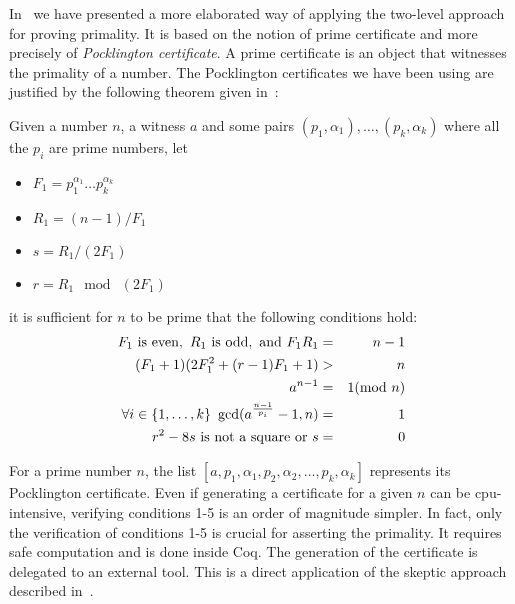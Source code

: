 In~\cite{GreTheWer} we have presented a more elaborated way of applying 
the two-level approach for proving primality. It is based on the
notion of prime certificate and more precisely of {\it Pocklington certificate}.
A prime certificate is an object that witnesses the primality of a number.
The Pocklington certificates we have been using are justified by the following
theorem given in~\cite{lehmer}:
\begin{theorem}\label{lehmer}
Given a number $n$, a witness $a$ and some pairs $(p_1,\alpha_1),\dots,(p_k,\alpha_k)$
 where all the $p_i$ are prime numbers,
 let
 \begin{itemize}
\item[]$F_1 = p_1^{\alpha_1}\dots p_k^{\alpha_k}$
\item[]$R_1 = (n - 1) / F_1$
\item[]$ s = R_1 / (2F_1)$
\item[] $r = R_1 \mod\ (2F_1)$
 \end{itemize}
 it is sufficient for $n$ to be prime that the following conditions hold:
\begin{eqnarray}
F_1 \,\,\hbox{is even},\,\,
R_1 \,\, \hbox{is odd}, \,\,\hbox{and}\,\,
F_1R_1  &=&  n -1\\
(F_1 + 1) (2F_1^2 + (r - 1) F_1 + 1) & >& n\\
a^{n-1} &=& 1 (\mod\ n)\\
\forall i\in\{1,\dots,k\}~\gcd(a^{\frac{n-1}{p_i}}-1,n)&=&1\\
r^2 - 8 s\,\,\mbox{is not a square}\,\,\hbox{or}\,\,s &=& 0
\end{eqnarray}
\end{theorem}
For a prime number $n$, the list $[a, p_1, \alpha_1, p_2, \alpha_2, \dots, p_k, \alpha_k]$
represents its Pocklington certificate.
Even if generating a certificate for a given $n$ can be cpu-intensive, verifying
conditions 1-5 is an order of magnitude simpler. In fact, only
the verification of conditions 1-5 is crucial for asserting the primality. It requires
safe computation and is done inside {\sc Coq}.
The generation of the certificate is delegated to an external tool.
This is a direct application of the skeptic approach described in~\cite{BarBar,HarThe}.
                 
